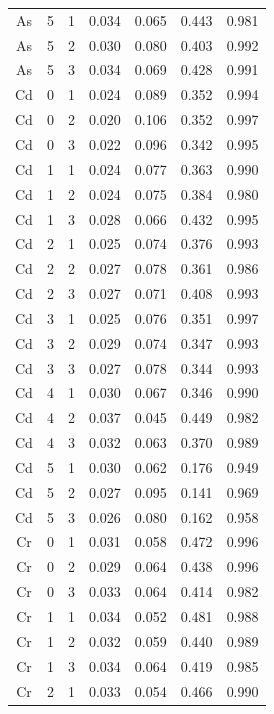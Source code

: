 \documentclass[ms, hidelinks]{uncgdissertationexp}
\theoremstyle{plain}
\theoremstyle{definition}
\theoremstyle{remark}
\begin{document}
\begin{longtable}{ccccccc}
As & 5 & 1 & 0.034 & 0.065 & 0.443 & 0.981\\
\rowcolor{gray!6}  As & 5 & 2 & 0.030 & 0.080 & 0.403 & 0.992\\
As & 5 & 3 & 0.034 & 0.069 & 0.428 & 0.991\\
\rowcolor{gray!6}  Cd & 0 & 1 & 0.024 & 0.089 & 0.352 & 0.994\\
Cd & 0 & 2 & 0.020 & 0.106 & 0.352 & 0.997\\
\rowcolor{gray!6}  Cd & 0 & 3 & 0.022 & 0.096 & 0.342 & 0.995\\
Cd & 1 & 1 & 0.024 & 0.077 & 0.363 & 0.990\\
\rowcolor{gray!6}  Cd & 1 & 2 & 0.024 & 0.075 & 0.384 & 0.980\\
Cd & 1 & 3 & 0.028 & 0.066 & 0.432 & 0.995\\
\rowcolor{gray!6}  Cd & 2 & 1 & 0.025 & 0.074 & 0.376 & 0.993\\
Cd & 2 & 2 & 0.027 & 0.078 & 0.361 & 0.986\\
\rowcolor{gray!6}  Cd & 2 & 3 & 0.027 & 0.071 & 0.408 & 0.993\\
Cd & 3 & 1 & 0.025 & 0.076 & 0.351 & 0.997\\
\rowcolor{gray!6}  Cd & 3 & 2 & 0.029 & 0.074 & 0.347 & 0.993\\
Cd & 3 & 3 & 0.027 & 0.078 & 0.344 & 0.993\\
\rowcolor{gray!6}  Cd & 4 & 1 & 0.030 & 0.067 & 0.346 & 0.990\\
Cd & 4 & 2 & 0.037 & 0.045 & 0.449 & 0.982\\
\rowcolor{gray!6}  Cd & 4 & 3 & 0.032 & 0.063 & 0.370 & 0.989\\
Cd & 5 & 1 & 0.030 & 0.062 & 0.176 & 0.949\\
\rowcolor{gray!6}  Cd & 5 & 2 & 0.027 & 0.095 & 0.141 & 0.969\\
Cd & 5 & 3 & 0.026 & 0.080 & 0.162 & 0.958\\
\rowcolor{gray!6}  Cr & 0 & 1 & 0.031 & 0.058 & 0.472 & 0.996\\
Cr & 0 & 2 & 0.029 & 0.064 & 0.438 & 0.996\\
\rowcolor{gray!6}  Cr & 0 & 3 & 0.033 & 0.064 & 0.414 & 0.982\\
Cr & 1 & 1 & 0.034 & 0.052 & 0.481 & 0.988\\
\rowcolor{gray!6}  Cr & 1 & 2 & 0.032 & 0.059 & 0.440 & 0.989\\
Cr & 1 & 3 & 0.034 & 0.064 & 0.419 & 0.985\\
\rowcolor{gray!6}  Cr & 2 & 1 & 0.033 & 0.054 & 0.466 & 0.990\\

\end{longtable}
\end{document}

